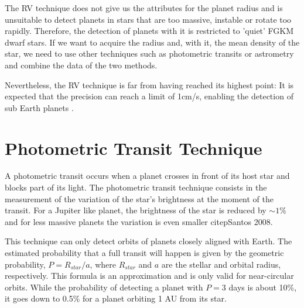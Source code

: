 \documentclass[dvips,12pt,a4paper]{report}
\begin{document}
The RV technique does not give us the attributes for the planet radius and is unsuitable to detect planets in stars that are too massive, instable or rotate too rapidly. Therefore, the detection of planets with it is restricted to 'quiet' FGKM dwarf stars. If we want to acquire the radius and, with it, the mean density of the star, we need to use other techniques such as photometric transits or astrometry and combine the data of the two methods.

Nevertheless, the RV technique is far from having reached its highest point: It is expected that the precision can reach a limit of 1cm/s, enabling the detection of sub Earth planets \citep{Lovis-2006b}. 




\section{Photometric Transit Technique}
\label{transit}
A photometric transit occurs when a planet crosses in front of its host star and blocks part of its light. 
The photometric transit technique consists in the measurement of the variation of the star's brightness at the moment of the transit. For a Jupiter like planet, the brightness of the star is reduced by $\sim 1\%$ and for less massive planets the variation is even smaller citep{Santos 2008}. %

This technique can only detect orbits of planets closely aligned with Earth. The estimated probability that a full transit will happen is given by the geometric probability, $P=R_{star}/a$, where $R_{star}$ and $a$ are the stellar and orbital radius, respectively. This formula is an approximation and is only valid for near-circular orbits. While the probability of detecting a planet with $P=3$ days is about 10\%, it goes down to 0.5\% for a planet orbiting 1 AU from its star.
\end{document}

